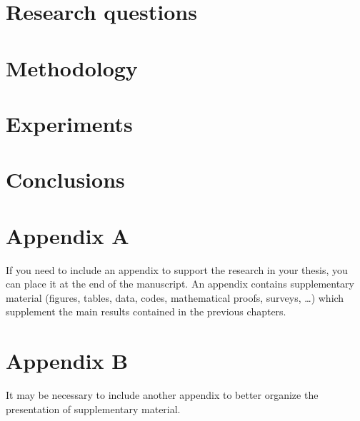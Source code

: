 \documentclass{Configuration_Files/PoliMi3i_thesis}
\begin{document}
\chapter{Research questions}\label{ch:reseatch_questions}


\chapter{Methodology}\label{ch:methodology}


\chapter{Experiments}\label{ch:experiments}


\chapter{Conclusions}\label{ch:conclusions}





\cleardoublepage
{} %
\appendix
\chapter{Appendix A}
If you need to include an appendix to support the research in your thesis, you can place it at the end of the manuscript.
An appendix contains supplementary material (figures, tables, data, codes, mathematical proofs, surveys, \dots)
which supplement the main results contained in the previous chapters.

\chapter{Appendix B}
It may be necessary to include another appendix to better organize the presentation of supplementary material.
\end{document}
